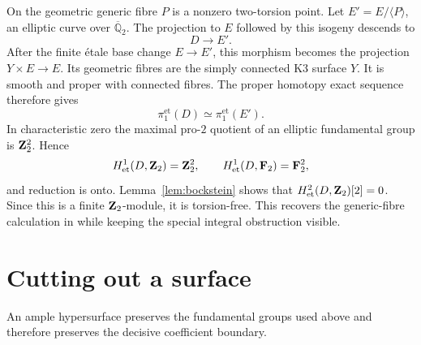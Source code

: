 \documentclass[11pt]{article}
\newcommand{\FF}{\mathbf F}\newcommand{\PP}{\mathbf P}
\newcommand{\et}{\mathrm{et}}\newcommand{\crys}{\mathrm{crys}}
\theoremstyle{definition}\newtheorem{definition}[theorem]{Definition}
\theoremstyle{remark}\newtheorem{remark}[theorem]{Remark}
\begin{document}
On the geometric generic fibre $P$ is a nonzero two-torsion point. Let $E'=E/\langle P\rangle$, an elliptic curve over $\overline{\mathbb Q}_2$. The projection to $E$ followed by this isogeny descends to
\[
 D\longrightarrow E'.
\]
After the finite \'etale base change $E\to E'$, this morphism becomes the projection $Y\times E\to E$. Its geometric fibres are the simply connected K3 surface $Y$. It is smooth and proper with connected fibres. The proper homotopy exact sequence \citep[Proposition~58.15.2, Tag~0C0J]{Stacks} therefore gives
\[
 \pi_1^{\et}(D)\simeq\pi_1^{\et}(E').
\]
In characteristic zero the maximal pro-$2$ quotient of an elliptic fundamental group is $\mathbf Z_2^2$. Hence
\[
 H^1_{\et}(D,\ZZ_2)=\ZZ_2^2,
 \qquad H^1_{\et}(D,\FF_2)=\FF_2^2,
\]
and reduction is onto. Lemma~\ref{lem:bockstein} shows that $H^2_{\et}(D,\ZZ_2)[2]=0$. Since this is a finite $\mathbf Z_2$-module, it is torsion-free. This recovers the generic-fibre calculation in \citet[proof of Proposition~2.2, pp.~237--238]{BMS} while keeping the special integral obstruction visible.

\section{Cutting out a surface}

An ample hypersurface preserves the fundamental groups used above and therefore preserves the decisive coefficient boundary.
\end{document}
